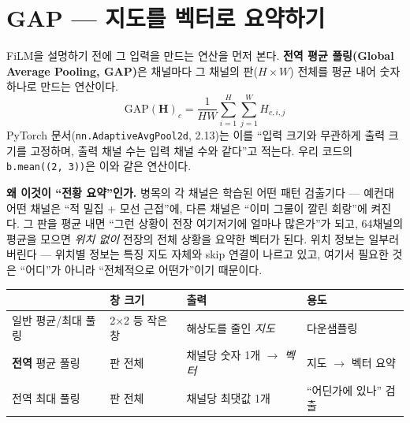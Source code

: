 \documentclass[11pt]{article}
\begin{document}
\section{GAP --- 지도를 벡터로 요약하기}

FiLM을 설명하기 전에 그 입력을 만드는 연산을 먼저 본다.
\textbf{전역 평균 풀링(Global Average Pooling, GAP)}은 채널마다 그 채널의 판($H\times W$) 전체를 평균 내어
숫자 하나로 만드는 연산이다.
\[
\mathrm{GAP}(\mathbf{H})_c = \frac{1}{HW}\sum_{i=1}^{H}\sum_{j=1}^{W} H_{c,i,j}
\]
PyTorch 문서(\texttt{nn.AdaptiveAvgPool2d}, 2.13)는 이를 ``입력 크기와 무관하게 출력 크기를 고정하며, 출력
채널 수는 입력 채널 수와 같다''고 적는다. 우리 코드의 \texttt{b.mean((2, 3))}은 이와 같은 연산이다.

\begin{center}
\end{center}

\textbf{왜 이것이 ``전황 요약''인가.} 병목의 각 채널은 학습된 어떤 패턴 검출기다 --- 예컨대 어떤 채널은
``적 밀집 + 모선 근접''에, 다른 채널은 ``이미 그물이 깔린 회랑''에 켜진다. 그 판을 평균 내면 ``그런 상황이
전장 여기저기에 얼마나 많은가''가 되고, 64채널의 평균을 모으면 \emph{위치 없이} 전장의 전체 상황을
요약한 벡터가 된다. 위치 정보는 일부러 버린다 --- 위치별 정보는 특징 지도 자체와 skip 연결이 나르고 있고,
여기서 필요한 것은 ``어디''가 아니라 ``전체적으로 어떤가''이기 때문이다.

\begin{center}
\small
\begin{tabular}{@{}llll@{}}
\toprule
 & 창 크기 & 출력 & 용도 \\
\midrule
일반 평균/최대 풀링 & 2$\times$2 등 작은 창 & 해상도를 줄인 \emph{지도} & 다운샘플링 \\
\textbf{전역} 평균 풀링 & 판 전체 & 채널당 숫자 1개 $\to$ \emph{벡터} & 지도 $\to$ 벡터 요약 \\
전역 최대 풀링 & 판 전체 & 채널당 최댓값 1개 & ``어딘가에 있나'' 검출 \\
\bottomrule
\end{tabular}
\end{center}
\end{document}

